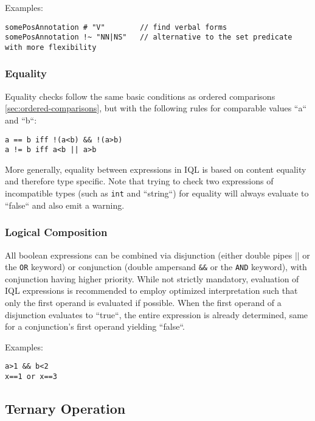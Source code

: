 \documentclass[11pt]{article}
\begin{document}
Examples:

\begin{verbatim}
somePosAnnotation # "V"        // find verbal forms
somePosAnnotation !~ "NN|NS"   // alternative to the set predicate with more flexibility
\end{verbatim}

\subsubsection{Equality}
\label{sec:equality}

Equality checks follow the same basic conditions as ordered comparisons \cref{sec:ordered-comparisons}, but with the following rules for comparable values ``a`` and ``b``:

\begin{verbatim}
a == b iff !(a<b) && !(a>b)
a != b iff a<b || a>b
\end{verbatim}

More generally, equality between expressions in IQL is based on content equality and therefore type specific.
Note that trying to check two expressions of incompatible types (such as \texttt{int} and ``string``) for equality will always evaluate to ``false`` and also emit a warning. 

\subsubsection{Logical Composition}
\label{sec:logical-composition}

All boolean expressions can be combined via disjunction (either double pipes \texttt{$||$} or the \texttt{OR} keyword) or conjunction (double ampersand \texttt{\&\&} or the \texttt{AND} keyword), with conjunction having higher priority. While not strictly mandatory, evaluation of IQL expressions is recommended to employ optimized interpretation such that only the first operand is evaluated if possible. When the first operand of a disjunction evaluates to ``true``, the entire expression is already determined, same for a conjunction's first operand yielding ``false``.  

Examples:

\begin{verbatim}
a>1 && b<2
x==1 or x==3
\end{verbatim}

\subsection{Ternary Operation}
\label{sec:ternary-operation}
\end{document}
